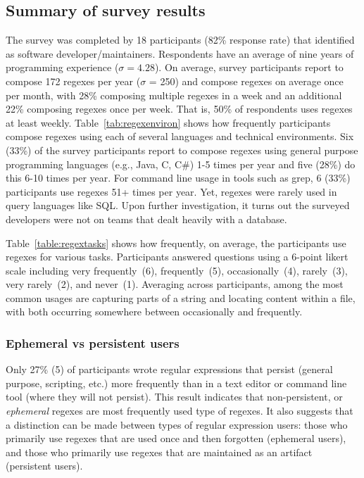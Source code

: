 \subsection{Summary of survey results}
\label{sec:surveyResults}


The survey was completed by 18 participants (82\% response rate) that identified as software developer/maintainers.
Respondents have an average of nine years of programming experience ($\sigma = 4.28$).
On average, survey participants report to compose 172 regexes per year ($\sigma$ = 250) and compose regexes on average once per month, with 28\% composing multiple regexes in a week and an additional 22\% composing regexes once per week. That is, 50\% of respondents uses regexes at least weekly.
Table~\ref{tab:regexenviron} shows how frequently participants compose regexes using each of several languages and technical environments.
Six (33\%) of the survey participants report to compose regexes using general purpose programming languages (e.g., Java, C, C\#) 1-5 times per year and five (28\%) do this 6-10 times per year.  For command line usage in tools such as grep, 6 (33\%) participants use regexes 51+ times per year. Yet, regexes were rarely used in query languages like SQL. Upon further investigation, it turns out the surveyed developers were not on teams that dealt heavily with a database.





Table~\ref{table:regextasks} shows how frequently, on average, the participants use
regexes for various tasks.
Participants answered questions using a 6-point likert scale including very frequently~(6), frequently~(5), occasionally~(4), rarely~(3), very rarely~(2), and never~(1).
Averaging across participants, among the most common usages are capturing parts of a string and locating content within a file, with both occurring somewhere between occasionally and frequently.


\subsubsection{Ephemeral vs persistent users}
Only 27\% (5)
of participants wrote regular expressions that persist (general purpose, scripting, etc.) more frequently than in a text editor or command line tool (where they will not persist).  This result indicates that non-persistent, or \emph{ephemeral} regexes are most frequently used type of regexes.  It also suggests that a distinction can be made between types of regular expression users: those who primarily use regexes that are used once and then forgotten (ephemeral users), and those who primarily use regexes that are maintained as an artifact (persistent users).

